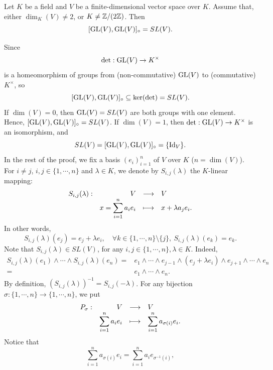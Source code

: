 \begin{theoremenv}\label{thm:5.6.*}
    Let $K$ be a field and $V$ be a finite-dimensional vector space over $K$.
    Assume that, either $\dim_{K}(V) \neq 2$, or $K \neq \mathbb{Z} /(2\mathbb{Z})$.
    Then
    $$[\operatorname{\mathrm{GL}}(V), \operatorname{\mathrm{GL}}(V)]_{\circ} = SL(V).$$
\end{theoremenv}
\begin{proofenv}
    Since
    $$\det : \operatorname{\mathrm{GL}}(V) \rightarrow K^\times$$
    is a homeomorphism of groups from (non-commutative) $\operatorname{\mathrm{GL}}(V)$ to (commutative) $K^\times$,
    so
    $$[\operatorname{\mathrm{GL}}(V), \operatorname{\mathrm{GL}}(V)]_{\circ} \subseteq \ker (\det) = SL(V).$$
    If $\dim (V) = 0$, then $\operatorname{\mathrm{GL}}(V) = SL(V)$ are both groups with one element.
    Hence, $[\operatorname{\mathrm{GL}}(V), \operatorname{\mathrm{GL}}(V)]_{\circ} = SL(V)$.
    If $\dim (V) = 1$, then $\det : \operatorname{\mathrm{GL}}(V) \rightarrow K^\times$ is an isomorphism, and
    $$SL(V) = [\operatorname{\mathrm{GL}}(V), \operatorname{\mathrm{GL}}(V)]_{\circ} = \{\operatorname{\mathrm{Id}}_{V}\}.$$
    In the rest of the proof, we fix a basis $(e_i)_{i=1}^{n}$ of $V$ over $K$ ($n = \dim (V)$).
    For $i \neq j$, $i,j \in \{1,\cdots,n\}$ and $\lambda \in K$, we denote by $S_{i,j}(\lambda)$ the $K$-linear mapping:
    $$\begin{array}{rrcl}
        S_{i,j}(\lambda) : & V & \longrightarrow & V\\
        & \displaystyle x = \sum_{i=1}^n a_i e_i & \longmapsto & x + \lambda a_j e_i.
    \end{array}$$
    In other words,
    $$S_{i,j}(\lambda)(e_j) = e_{j} + \lambda e_{i}, \quad \forall k \in \{1,\cdots,n\}\setminus \{j\},\ S_{i,j}(\lambda)(e_{k}) = e_{k}.$$
    Note that $S_{i,j}(\lambda) \in SL(V)$, for any $i,j \in \{1,\cdots, n\}, \lambda \in K$.
    Indeed,
    $$\begin{aligned}
        S_{i,j}(\lambda)(e_1) \wedge \cdots \wedge S_{i,j}(\lambda)(e_n) = & e_1 \wedge \cdots \wedge e_{j-1} \wedge (e_{j} + \lambda e_i) \wedge e_{j + 1} \wedge \cdots \wedge e_{n}\\
        = & e_1 \wedge \cdots \wedge e_{n}.
    \end{aligned}$$
    By definition, $\left(S_{i,j}(\lambda)\right)^{-1} = S_{i,j} (-\lambda)$.
    For any bijection $\sigma : \{1,\cdots,n\} \rightarrow \{1,\cdots,n\}$, we put
    $$\begin{array}{rrcl}
        P_{\sigma} : & V & \longrightarrow & V\\
        & \displaystyle \sum_{i=1}^n a_i e_i & \longmapsto & \displaystyle \sum_{i=1}^n a_{\sigma(i)} e_i.
    \end{array}$$
    Notice that 
    $$\sum_{i=1}^{n} a_{\sigma(i)} e_i = \sum_{i=1}^{n} a_i e_{\sigma^{-1}(i)},$$

\end{proofenv}
